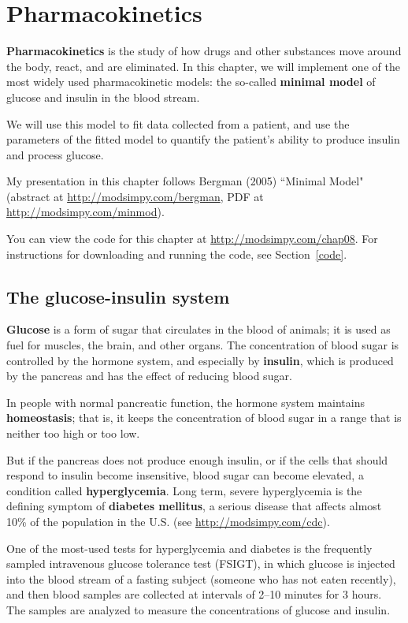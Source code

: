 \documentclass[12pt]{book}
\theoremstyle{exercise}
\begin{document}
\chapter{Pharmacokinetics}

{\bf Pharmacokinetics} is the study of how drugs and other substances move around the body, react, and are eliminated.  In this chapter, we will implement one of the most widely used pharmacokinetic models: the so-called {\bf minimal model} of glucose and insulin in the blood stream.

We will use this model to fit data collected from a patient, and use the parameters of the fitted model to quantify the patient's ability to produce insulin and process glucose.

My presentation in this chapter follows Bergman (2005) ``Minimal Model" (abstract at \url{http://modsimpy.com/bergman},
PDF at \url{http://modsimpy.com/minmod}).

You can view the code for this chapter at \url{http://modsimpy.com/chap08}.  For instructions for downloading and running the code, see Section~\ref{code}.


\section{The glucose-insulin system}

{\bf Glucose} is a form of sugar that circulates in the blood of animals; it is used as fuel for muscles, the brain, and other organs.  The concentration of blood sugar is controlled by the hormone system, and especially by {\bf insulin}, which is produced by the pancreas and has the effect of reducing blood sugar.

In people with normal pancreatic function, the hormone system maintains {\bf homeostasis}; that is, it keeps the concentration of blood sugar in a range that is neither too high or too low.

But if the pancreas does not produce enough insulin, or if the cells that should respond to insulin become insensitive, blood sugar can become elevated, a condition called {\bf hyperglycemia}.  Long term, severe hyperglycemia is the defining symptom of {\bf diabetes mellitus}, a serious disease that affects almost 10\% of the population in the U.S. (see \url{http://modsimpy.com/cdc}).

One of the most-used tests for hyperglycemia and diabetes is the frequently sampled intravenous glucose tolerance test (FSIGT), in which glucose is injected into the blood stream of a fasting subject (someone who has not eaten recently), and then blood samples are collected at intervals of 2--10 minutes for 3 hours.  The samples are analyzed to measure the concentrations of glucose and insulin.
\end{document}
